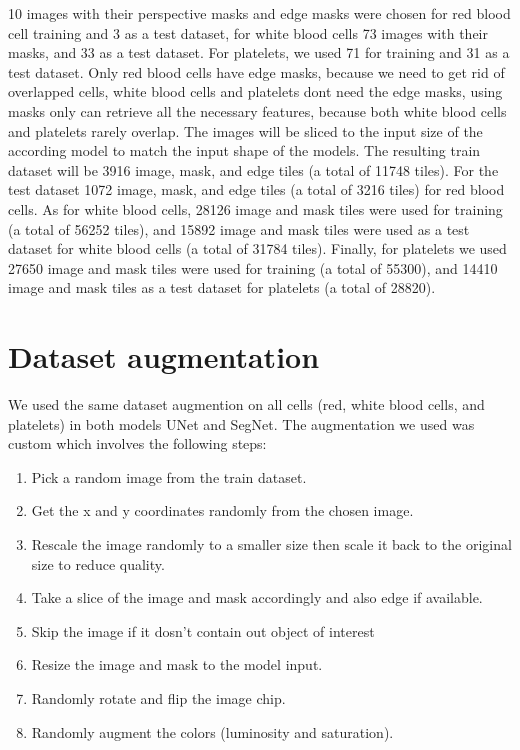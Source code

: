 10 images with their perspective masks and edge masks were chosen for red blood cell training and 3 as a test dataset, for white blood cells 73 images with their masks, and 33 as a test dataset.
For platelets, we used 71 for training and 31 as a test dataset.
Only red blood cells have edge masks, because we need to get rid of overlapped cells, white blood cells and platelets dont need the edge masks, using masks only can retrieve all the necessary features, because both white blood cells and platelets rarely overlap.
The images will be sliced to the input size of the according model to match the input shape of the models.
The resulting train dataset will be 3916 image, mask, and edge tiles (a total of 11748 tiles).
For the test dataset 1072 image, mask, and edge tiles (a total of 3216 tiles) for red blood cells.
As for white blood cells, 28126 image and mask tiles were used for training (a total of 56252 tiles), and 15892 image and mask tiles were used as a test dataset for white blood cells (a total of 31784 tiles).
Finally, for platelets we used 27650 image and mask tiles were used for training (a total of 55300), and 14410 image and mask tiles as a test dataset for platelets (a total of 28820).

\vspace{0.1in}



\section{Dataset augmentation}
\hspace{\parindent}
We used the same dataset augmention on all cells (red, white blood cells, and platelets) in both models UNet and SegNet.
The augmentation we used was custom which involves the following steps:
\begin{enumerate}
    \item Pick a random image from the train dataset.
    \item Get the x and y coordinates randomly from the chosen image.
    \item Rescale the image randomly to a smaller size then scale it back to the original size to reduce quality.
    \item Take a slice of the image and mask accordingly and also edge if available.
    \item Skip the image if it dosn't contain out object of interest
    \item Resize the image and mask to the model input.
    \item Randomly rotate and flip the image chip.
    \item Randomly augment the colors (luminosity and saturation).
\end{enumerate}

